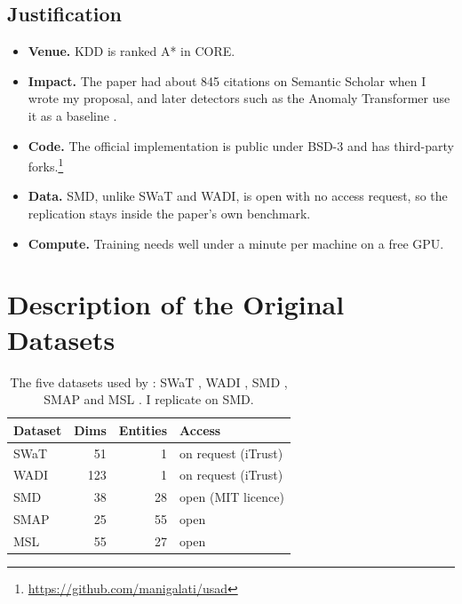 \documentclass[11pt]{article}
\begin{document}
\subsection{Justification}
\begin{itemize}
\item \textbf{Venue.} KDD is ranked A* in CORE.
\item \textbf{Impact.} The paper had about 845 citations on Semantic Scholar when I wrote my proposal, and later detectors such as the Anomaly Transformer use it as a baseline \citep{xu2022anomaly}.
\item \textbf{Code.} The official implementation is public under BSD-3 and has third-party forks.\footnote{\url{https://github.com/manigalati/usad}}
\item \textbf{Data.} SMD, unlike SWaT and WADI, is open with no access request, so the replication stays inside the paper's own benchmark.
\item \textbf{Compute.} Training needs well under a minute per machine on a free GPU.
\end{itemize}

\section{Description of the Original Datasets}
\label{sec:origdata}

\begin{table}[t]
\centering\small
\setlength{\tabcolsep}{3pt}
\begin{tabular}{lrrl}
\toprule
Dataset & Dims & Entities & Access \\
\midrule
SWaT & 51 & 1 & on request (iTrust) \\
WADI & 123 & 1 & on request (iTrust) \\
SMD & 38 & 28 & open (MIT licence) \\
SMAP & 25 & 55 & open \\
MSL & 55 & 27 & open \\
\bottomrule
\end{tabular}
\caption{The five datasets used by \citet{audibert2020usad}: SWaT \citep{mathur2016swat}, WADI \citep{ahmed2017wadi}, SMD \citep{su2019omnianomaly}, SMAP and MSL \citep{hundman2018}. I replicate on SMD.}
\label{tab:origdata}
\end{table}
\end{document}

